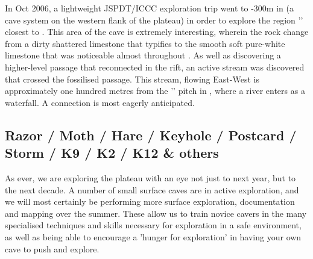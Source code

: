 In Oct 2006, a lightweight JSPDT/ICCC exploration trip went to -300m in  (a cave system on the western flank of the plateau) in order to explore the region '' closest to . This area of the cave is extremely interesting, wherein the rock change from a dirty shattered limestone that typifies  to the smooth soft pure-white limestone that was noticeable almost throughout . As well as discovering a higher-level passage that reconnected in the rift, an active stream was discovered that crossed the fossilised passage. This stream, flowing East-West is approximately one hundred metres from the '' pitch in , where a river enters as a waterfall. A connection is most eagerly anticipated.



\subsection{Razor / Moth / Hare / Keyhole / Postcard / Storm / K9 / K2 / K12 \& others}

As ever, we are exploring the plateau with an eye not just to next year, but to the next decade. A number of small surface caves are in active exploration, and we will most certainly be performing more surface exploration, documentation and mapping over the summer. These allow us to train novice cavers in the many specialised techniques and skills necessary for exploration in a safe environment, as well as being able to encourage a 'hunger for exploration' in having your own cave to push and explore.

